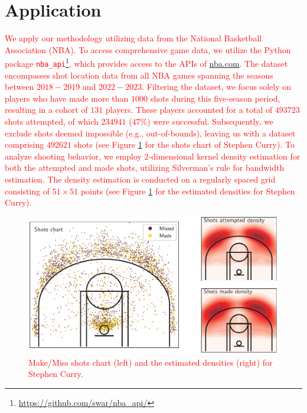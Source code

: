 \section{Application} %
\label{sec:application}

\textcolor{red}{We apply our methodology utilizing data from the National Basketball Association (NBA). To access comprehensive game data, we utilize the Python package \texttt{nba\_api}\footnote{\url{https://github.com/swar/nba_api/}}, which provides access to the APIs of \url{nba.com}. The dataset encompasses shot location data from all NBA games spanning the seasons between $2018-2019$ and $2022-2023$. Filtering the dataset, we focus solely on players who have made more than $1000$ shots during this five-season period, resulting in a cohort of $131$ players. These players accounted for a total of $493723$ shots attempted, of which $234941$ ($47\%$) were successful. Subsequently, we exclude shots deemed impossible (e.g., out-of-bounds), leaving us with a dataset comprising $492621$ shots (see Figure \ref{fig:shoots_make_miss} for the shots chart of Stephen Curry). To analyze shooting behavior, we employ 2-dimensional kernel density estimation for both the attempted and made shots, utilizing Silverman's rule \citep{silvermanDensityEstimationStatistics1986} for bandwidth estimation. The density estimation is conducted on a regularly spaced grid consisting of $51 \times 51$ points (see Figure \ref{fig:shoots_make_miss} for the estimated densities for Stephen Curry).}

\begin{figure}
    \centering
    \includegraphics[width=\textwidth]{figures/curry.pdf}
    \caption{\textcolor{red}{Make/Miss shots chart (left) and the estimated densities (right) for Stephen Curry.}}
    \label{fig:shoots_make_miss}
\end{figure}


